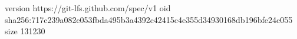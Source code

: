 version https://git-lfs.github.com/spec/v1
oid sha256:717c239a082e053fbda495b3a4392c42415c4e355d34930168db196bfe24c055
size 131230
